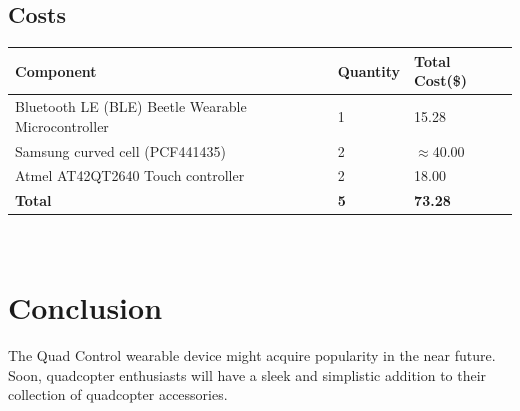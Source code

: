 \documentclass[12pt,letterpaper]{article}
\begin{document}
\subsection*{Costs}
\begin{tabular}{| l | l | l |}
	\hline
	Component & Quantity & Total Cost(\$) \\ \hline
	Bluetooth LE (BLE) Beetle Wearable Microcontroller & 1 & 15.28 \\ \hline
	Samsung curved cell (PCF441435) & 2 & $\approx$40.00\\ \hline
	Atmel AT42QT2640 Touch controller & 2 & 18.00\\ \hline
	\textbf{Total} & \textbf{5} & \textbf{73.28}\\ \hline
\end{tabular} \\



\section*{Conclusion}
The Quad Control wearable device might acquire popularity in the near future. Soon, quadcopter enthusiasts will have a sleek and simplistic addition to their collection of quadcopter accessories. 

\newpage


\end{document}
